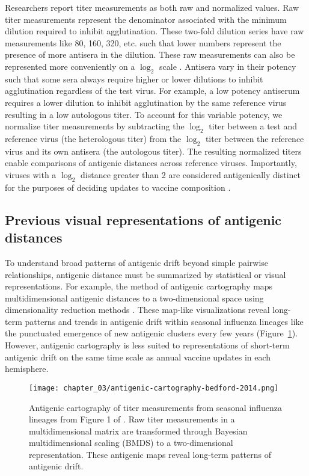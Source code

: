 Researchers report titer measurements as both raw and normalized values.
Raw titer measurements represent the denominator associated with the minimum dilution required to inhibit agglutination.
These two-fold dilution series have raw measurements like 80, 160, 320, etc. such that lower numbers represent the presence of more antisera in the dilution.
These raw measurements can also be represented more conveniently on a $\log_{2}$ scale \citep{Smith:2004jc,Bedford:2014bf}.
Antisera vary in their potency such that some sera always require higher or lower dilutions to inhibit agglutination regardless of the test virus.
For example, a low potency antiserum requires a lower dilution to inhibit agglutination by the same reference virus resulting in a low autologous titer.
To account for this variable potency, we normalize titer measurements by subtracting the $\log_{2}$ titer between a test and reference virus (the heterologous titer) from the $\log_{2}$ titer between the reference virus and its own antisera (the autologous titer).
The resulting normalized titers enable comparisons of antigenic distances across reference viruses.
Importantly, viruses with a $\log_{2}$ distance greater than 2 are considered antigenically distinct for the purposes of deciding updates to vaccine composition \citep{}.

\subsection{Previous visual representations of antigenic distances}

To understand broad patterns of antigenic drift beyond simple pairwise relationships, antigenic distance must be summarized by statistical or visual representations.
For example, the method of antigenic cartography maps multidimensional antigenic distances to a two-dimensional space using dimensionality reduction methods \citep{Smith:2004jc,Bedford:2014bf}.
These map-like visualizations reveal long-term patterns and trends in antigenic drift within seasonal influenza lineages like the punctuated emergence of new antigenic clusters every few years (Figure~\ref{fig:antigenic-cartography-bedford-2014}).
However, antigenic cartography is less suited to representations of short-term antigenic drift on the same time scale as annual vaccine updates in each hemisphere.

\begin{figure}
  \centering
  \texttt{[image: chapter\_03/antigenic-cartography-bedford-2014.png]}
  \caption{\label{fig:antigenic-cartography-bedford-2014} Antigenic cartography of titer measurements from seasonal influenza lineages from Figure 1 of \citet{Bedford:2014bf}.
    Raw titer measurements in a multidimensional matrix are transformed through Bayesian multidimensional scaling (BMDS) to a two-dimensional representation.
    These antigenic maps reveal long-term patterns of antigenic drift.}
\end{figure}

